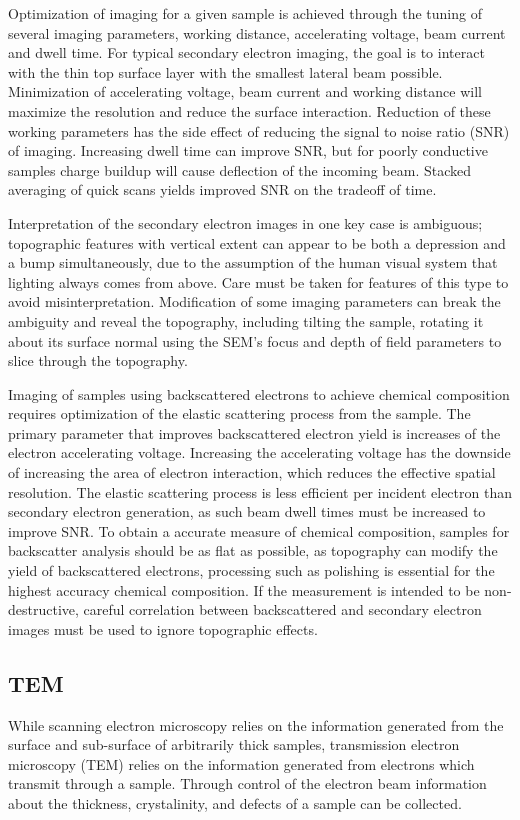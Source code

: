 Optimization of imaging for a given sample is achieved through the tuning of several imaging parameters, working distance, accelerating voltage, beam current and dwell time\cite{goldstein2003scanning}.
For typical secondary electron imaging, the goal is to interact with the thin top surface layer with the smallest lateral beam possible.
Minimization of accelerating voltage, beam current and working distance will maximize the resolution and reduce the surface interaction.
Reduction of these working parameters has the side effect of reducing the signal to noise ratio (SNR) of imaging.
Increasing dwell time can improve SNR, but for poorly conductive samples charge buildup will cause deflection of the incoming beam.
Stacked averaging of quick scans yields improved SNR on the tradeoff of time.

Interpretation of the secondary electron images in one key case is ambiguous; topographic features with vertical extent can appear to be both a depression and a bump simultaneously, due to the assumption of the human visual system that lighting always comes from above\cite{goldstein2003scanning}.
Care must be taken for features of this type to avoid misinterpretation.
Modification of some imaging parameters can break the ambiguity and reveal the topography, including tilting the sample, rotating it about its surface normal using the SEM's focus and depth of field parameters to slice through the topography.

Imaging of samples using backscattered electrons to achieve chemical composition requires optimization of the elastic scattering process from the sample.
The primary parameter that improves backscattered electron yield is increases of the electron accelerating voltage.
Increasing the accelerating voltage has the downside of increasing the area of electron interaction, which reduces the effective spatial resolution\cite{goldstein2003scanning}.
The elastic scattering process is less efficient per incident electron than secondary electron generation, as such beam dwell times must be increased to improve SNR\@.
To obtain a accurate measure of chemical composition, samples for backscatter analysis should be as flat as possible, as topography can modify the yield of backscattered electrons, processing such as polishing is essential for the highest accuracy chemical composition.
If the measurement is intended to be non-destructive, careful correlation between backscattered and secondary electron images must be used to ignore topographic effects.
\subsection{TEM} While scanning electron microscopy relies on the information generated from the surface and sub-surface of arbitrarily thick samples, transmission electron microscopy (TEM) relies on the information generated from electrons which transmit through a sample.
Through control of the electron beam information about the thickness, crystalinity, and defects of a sample can be collected.


